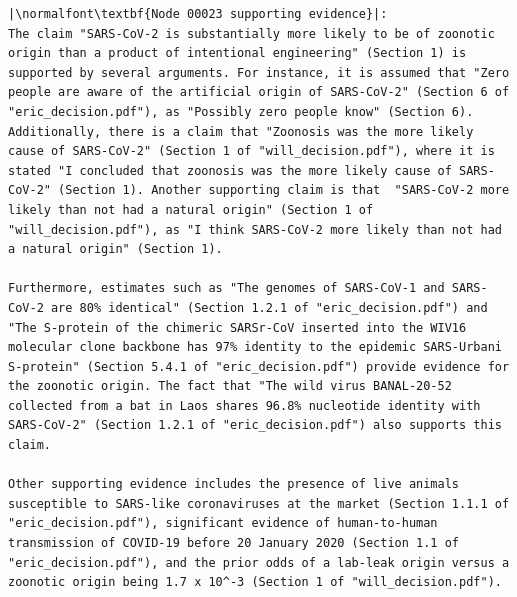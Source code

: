 \documentclass{article}
\begin{document}
\begin{lstlisting}
|\normalfont\textbf{Node 00023 supporting evidence}|:
The claim "SARS-CoV-2 is substantially more likely to be of zoonotic origin than a product of intentional engineering" (Section 1) is supported by several arguments. For instance, it is assumed that "Zero people are aware of the artificial origin of SARS-CoV-2" (Section 6 of "eric_decision.pdf"), as "Possibly zero people know" (Section 6). Additionally, there is a claim that "Zoonosis was the more likely cause of SARS-CoV-2" (Section 1 of "will_decision.pdf"), where it is stated "I concluded that zoonosis was the more likely cause of SARS-CoV-2" (Section 1). Another supporting claim is that  "SARS-CoV-2 more likely than not had a natural origin" (Section 1 of  "will_decision.pdf"), as "I think SARS-CoV-2 more likely than not had a natural origin" (Section 1). 

Furthermore, estimates such as "The genomes of SARS-CoV-1 and SARS-CoV-2 are 80% identical" (Section 1.2.1 of "eric_decision.pdf") and "The S-protein of the chimeric SARSr-CoV inserted into the WIV16 molecular clone backbone has 97% identity to the epidemic SARS-Urbani S-protein" (Section 5.4.1 of "eric_decision.pdf") provide evidence for the zoonotic origin. The fact that "The wild virus BANAL-20-52 collected from a bat in Laos shares 96.8% nucleotide identity with SARS-CoV-2" (Section 1.2.1 of "eric_decision.pdf") also supports this claim. 

Other supporting evidence includes the presence of live animals susceptible to SARS-like coronaviruses at the market (Section 1.1.1 of "eric_decision.pdf"), significant evidence of human-to-human transmission of COVID-19 before 20 January 2020 (Section 1.1 of "eric_decision.pdf"), and the prior odds of a lab-leak origin versus a zoonotic origin being 1.7 x 10^-3 (Section 1 of "will_decision.pdf").


\end{lstlisting}
\end{document}
